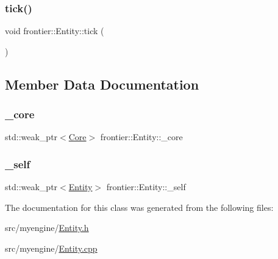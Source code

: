 \subsubsection{\texorpdfstring{tick()}{tick()}}
{\footnotesize\ttfamily void frontier\+::\+Entity\+::tick (\begin{DoxyParamCaption}{ }\end{DoxyParamCaption})}



\subsection{Member Data Documentation}
\mbox{\label{classfrontier_1_1_entity_aa6157be575485f3a37f11e57b5c8898e}} 
\subsubsection{\texorpdfstring{\+\_\+core}{\_core}}
{\footnotesize\ttfamily std\+::weak\+\_\+ptr$<$\hyperlink{classfrontier_1_1_core}{Core}$>$ frontier\+::\+Entity\+::\+\_\+core\hspace{0.3cm}{\ttfamily [protected]}}

\mbox{\label{classfrontier_1_1_entity_a29a54e9eb639ffa8ac51d2087b2c1ed5}} 
\subsubsection{\texorpdfstring{\+\_\+self}{\_self}}
{\footnotesize\ttfamily std\+::weak\+\_\+ptr$<$\hyperlink{classfrontier_1_1_entity}{Entity}$>$ frontier\+::\+Entity\+::\+\_\+self\hspace{0.3cm}{\ttfamily [protected]}}



The documentation for this class was generated from the following files\+:\begin{DoxyCompactItemize}
\item 
src/myengine/\hyperlink{_entity_8h}{Entity.\+h}\item 
src/myengine/\hyperlink{_entity_8cpp}{Entity.\+cpp}\end{DoxyCompactItemize}
